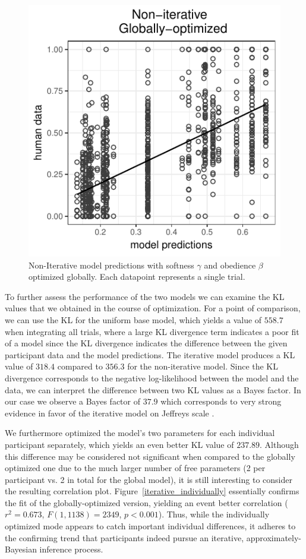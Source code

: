 \documentclass[10pt,a4paper]{article}
\begin{document}
 \begin{figure}[h]
	\centering
	\includegraphics[width=.8\linewidth]{images/m8.pdf}
	\caption{Non-Iterative model predictions with softness $\gamma$ and obedience $\beta$ optimized globally. Each datapoint represents a single trial.}	
	\label{non-iterative}
\end{figure}
 
To further assess the performance of the two models we can examine the KL values that we obtained in the course of optimization.
For a point of comparison, we can use the KL for the uniform base model, which yields a value of $558.7$ when integrating all trials, where a large KL divergence term indicates a poor fit of a model since the KL divergence indicates the difference between the given participant data and the model predictions.
The iterative model produces a KL value of $318.4$ compared to $356.3$ for the non-iterative model. 
Since the KL divergence corresponds to the negative log-likelihood between the model and the data, we can interpret the difference between two KL values as a Bayes factor.
In our case we observe a Bayes factor of $37.9$ which corresponds to very strong evidence in favor of the iterative model on Jeffreys scale \cite{jeffreys1961theory,Lewandowsky:2011}.


We furthermore optimized the model's two parameters for each individual participant separately, which yields an even better KL value of $237.89$.
Although this difference may be considered not significant when compared to the globally optimized one due to the much larger number of free parameters (2 per participant vs. 2 in total for the global model), it is still interesting to consider the resulting correlation plot. 
Figure~\ref{iterative_individually} essentially confirms the fit of the globally-optimized version, yielding an event better correlation ($r^2=0.673$, $F(1,1138) = 2349$, $p<0.001$).
Thus, while the individually optimized mode appears to catch important individual differences, it adheres to the confirming trend that participants indeed pursue an iterative, approximately-Bayesian inference process. 
\end{document}
